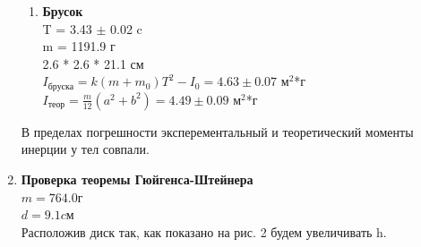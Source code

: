 \documentclass[12pt]{article}
\begin{document}
\begin{enumerate}
\begin{enumerate}
		   	\item \textbf{Брусок} \\\newline
		   	T = 3.43 $\pm$ 0.02 c \\
		   	m = 1191.9 г \\
		   	2.6 * 2.6 * 21.1 см \\
		   	$I_{бруска}=k(m+m_0)T^2-I_0=4.63 \pm 0.07 $ $м^2$*г \\
		   	$I_{теор}=\frac{m}{12}(a^2+b^2) = 4.49 \pm 0.09 $ $м^2$*г \\
		   \end{enumerate}
		   
		   В пределах погрешности эксперементальный и теоретический моменты инерции у тел совпали. \\
		   
		   \pagebreak
		   
	   \item \textbf{Проверка теоремы Гюйгенса-Штейнера} \\\newline
	      $m=764.0г$ \\
	      $d=9.1cм$ \\
	      Расположив диск так, как показано на рис. 2 будем увеличивать h. \\
	      

\end{enumerate}
\end{document}
